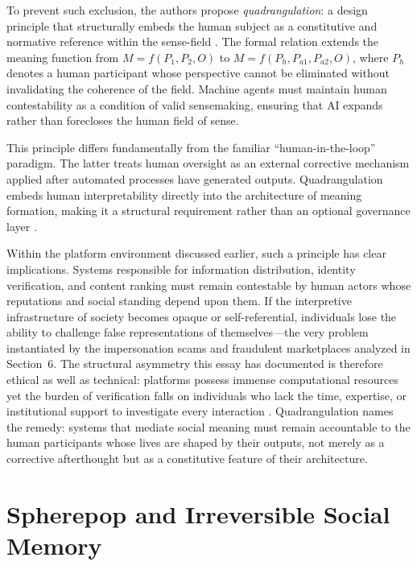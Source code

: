 \documentclass[12pt,a4paper]{article}
\begin{document}
To prevent such exclusion, the authors propose \emph{quadrangulation}: a design principle that
structurally embeds the human subject as a constitutive and normative reference within the
sense-field \citep{jelinek2026}. The formal relation extends the meaning function from
$M = f(P_1, P_2, O)$ to $M = f(P_h, P_{a1}, P_{a2}, O)$, where $P_h$ denotes a human
participant whose perspective cannot be eliminated without invalidating the coherence of the
field. Machine agents must maintain human contestability as a condition of valid sensemaking,
ensuring that AI expands rather than forecloses the human field of sense.

This principle differs fundamentally from the familiar ``human-in-the-loop'' paradigm. The
latter treats human oversight as an external corrective mechanism applied after automated
processes have generated outputs. Quadrangulation embeds human interpretability directly into
the architecture of meaning formation, making it a structural requirement rather than an
optional governance layer \citep{jelinek2026,gillespie2018}.

Within the platform environment discussed earlier, such a principle has clear implications.
Systems responsible for information distribution, identity verification, and content ranking
must remain contestable by human actors whose reputations and social standing depend upon them.
If the interpretive infrastructure of society becomes opaque or self-referential, individuals
lose the ability to challenge false representations of themselves---the very problem
instantiated by the impersonation scams and fraudulent marketplaces analyzed in Section~6.
The structural asymmetry this essay has documented is therefore ethical as well as technical:
platforms possess immense computational resources yet the burden of verification falls on
individuals who lack the time, expertise, or institutional support to investigate every
interaction \citep{noble2018}. Quadrangulation names the remedy: systems that mediate social
meaning must remain accountable to the human participants whose lives are shaped by their
outputs, not merely as a corrective afterthought but as a constitutive feature of their
architecture.

\section{Spherepop and Irreversible Social Memory}
\end{document}
